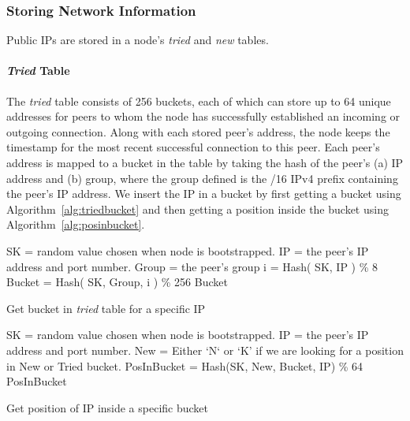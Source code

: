 \subsubsection{Storing Network Information}
Public IPs are stored in a node’s \emph{tried} and \emph{new} tables.

\paragraph*{\emph{Tried} Table}
The \emph{tried} table consists of 256 buckets, each of which can store up to 64 unique addresses for peers to whom the node has successfully established an incoming or outgoing connection. Along with each stored peer’s address, the node keeps the timestamp for the most recent successful connection to this peer.
Each peer’s address is mapped to a bucket in the table by taking the hash of the peer’s (a) IP address and (b) group, where the group defined is the /16 IPv4 prefix containing the peer’s IP address. We insert the IP in a bucket by first getting a bucket using Algorithm~\ref{alg:triedbucket} and then getting a position inside the bucket using Algorithm~\ref{alg:posinbucket}.

\begin{algorithm}
\begin{algorithmic}[1]
\State SK = random value chosen when node is bootstrapped.
\State IP = the peer’s IP address and port number.
\State Group = the peer’s group
\State
\State i = Hash( SK, IP ) \% 8
\State Bucket = Hash( SK, Group, i ) \% 256
\State \Return Bucket
\end{algorithmic}
\caption{Get bucket in \emph{tried} table for a specific IP}
\label{alg:triedbucket}
\end{algorithm}


\begin{algorithm}
\begin{algorithmic}[1]
\State SK = random value chosen when node is bootstrapped.
\State IP = the peer’s IP address and port number.
\State New = Either ‘N‘ or ‘K’ if we are looking for a position in New or Tried bucket.
\State
\State PosInBucket = Hash(SK, New, Bucket, IP) \% 64
\State \Return PosInBucket
\end{algorithmic}
\caption{Get position of IP inside a specific bucket}
\label{alg:posinbucket}
\end{algorithm}


